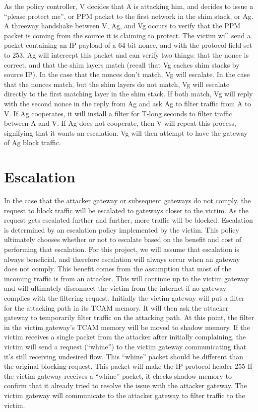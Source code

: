\documentclass[11pt]{article}
\begin{document}
As the policy controller, V decides that A is attacking him, and decides to issue a “please protect me”, or PPM packet to the first network in the shim stack, or Ag. A threeway handshake between V, Ag, and Vg occurs to verify that the PPM packet is coming from the source it is claiming to protect. The victim will send a packet containing an IP payload of a 64 bit nonce, and with the protocol field set to 253. Ag will intercept this packet and can verify two things: that the nonce is correct, and that the shim layers match (recall that Vg caches shim stacks by source IP). In the case that the nonces don’t match, Vg will escalate. In the case that the nonces match, but the shim layers do not match, Vg will escalate directly to the first matching layer in the shim stack. If both match, Vg will reply with the second nonce in the reply from Ag and ask Ag to filter traffic from A to V. If Ag cooperates, it will install a filter for T-long seconds to filter traffic between A and V. If Ag does not cooperate, then V will repeat this process, signifying that it wants an escalation. Vg will then attempt to have the gateway of Ag block traffic. 


\section{Escalation}
In the case that the attacker gateway or subsequent gateways do not comply, the request to block traffic will be escalated to gateways closer to the victim.  As the request gets escalated further and further, more traffic will be blocked.  Escalation is determined by an escalation policy implemented by the victim.  This policy ultimately chooses whether or not to escalate based on the benefit and cost of performing that escalation.  For this project, we will assume that escalation is always beneficial, and therefore escalation will always occur when an gateway does not comply.  This benefit comes from the assumption that most of the incoming traffic is from an attacker.  This will continue  up to the victim gateway and will ultimately disconnect the victim from the internet if no gateway complies with the filtering request.
Initially the victim gateway will put a filter for the attacking path in its TCAM memory.  It will then ask the attacker gateway to temporarily filter traffic on the attacking path.  At this point, the filter in the victim gateway’s TCAM memory will be moved to shadow memory.  If the victim receives a single packet from the attacker after initially complaining, the victim will send a request (“whine”) to the victim gateway communicating that it’s still receiving undesired flow.  This “whine” packet should be different than the original blocking request. This packet will make the IP protocol header 255  If the victim gateway receives a “whine” packet, it checks shadow memory to confirm that it already tried to resolve the issue with the attacker gateway.  The victim gateway will communicate to the attacker gateway to filter traffic to the victim.
\end{document}
